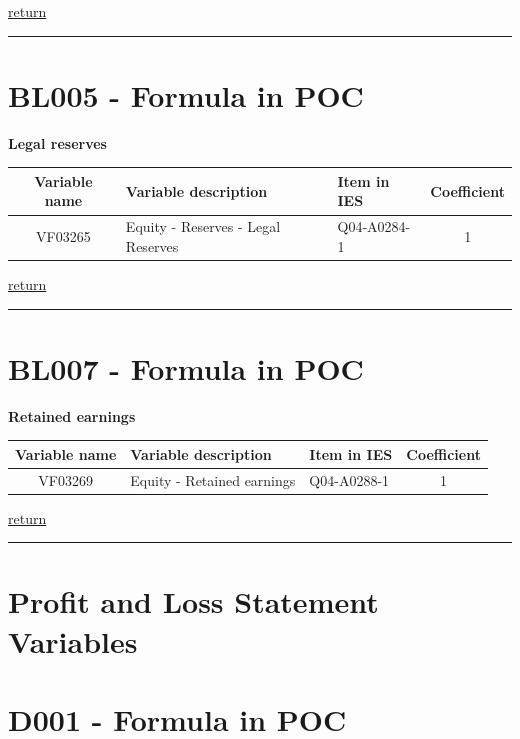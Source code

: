 \documentclass[]{book}
\begin{document}
\protect\hyperlink{liabilities}{return}

\begin{center}\rule{0.5\linewidth}{\linethickness}\end{center}

\hypertarget{bl005---formula-in-poc}{%
\section{BL005 - Formula in POC}\label{bl005---formula-in-poc}}

\textbf{Legal reserves}

\begin{longtable}[]{@{}cllc@{}}
\toprule
Variable name & Variable description & Item in IES & Coefficient\tabularnewline
\midrule
\endhead
VF03265 & Equity - Reserves - Legal Reserves & Q04-A0284-1 & 1\tabularnewline
\bottomrule
\end{longtable}

\protect\hyperlink{equity}{return}

\begin{center}\rule{0.5\linewidth}{\linethickness}\end{center}

\hypertarget{bl007---formula-in-poc}{%
\section{BL007 - Formula in POC}\label{bl007---formula-in-poc}}

\textbf{Retained earnings}

\begin{longtable}[]{@{}cllc@{}}
\toprule
Variable name & Variable description & Item in IES & Coefficient\tabularnewline
\midrule
\endhead
VF03269 & Equity - Retained earnings & Q04-A0288-1 & 1\tabularnewline
\bottomrule
\end{longtable}

\protect\hyperlink{equity}{return}

\begin{center}\rule{0.5\linewidth}{\linethickness}\end{center}

\hypertarget{profit-and-loss-statement-variables}{%
\section{Profit and Loss Statement Variables}\label{profit-and-loss-statement-variables}}

\hypertarget{d001---formula-in-poc}{%
\section{D001 - Formula in POC}\label{d001---formula-in-poc}}
\end{document}
